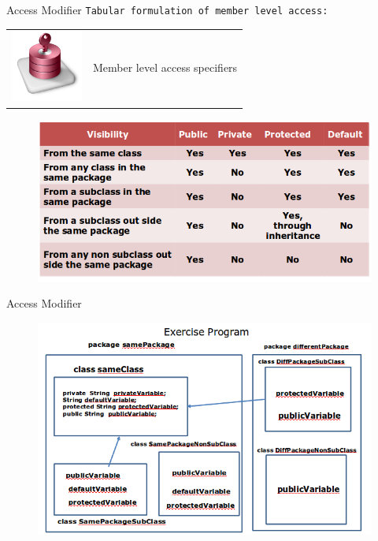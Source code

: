\documentclass[14pt]{beamer}
\begin{document}
\begin{frame}{Access Modifier}
 \texttt{Tabular formulation of member level access:}
 \begin{tabular}{l l}
\begin{minipage}{0.1\textwidth}
\includegraphics[scale=.4]{member-level-access-specifier.png}
\end{minipage}
&
\begin{minipage}{0.85\textwidth}
Member level access specifiers
\end{minipage}
\end{tabular} 
\begin{figure}[H]
 \begin{center}
   \includegraphics[scale=.4]{access-specifiers-table.png}   
 \end{center}
  \end{figure}
\end{frame}

\begin{frame}{Access Modifier}
 \begin{figure}[H]
 \begin{center}
   \includegraphics[scale=.4]{exercise-program.png}   
 \end{center}
  \end{figure}
\end{frame}
\end{document}
